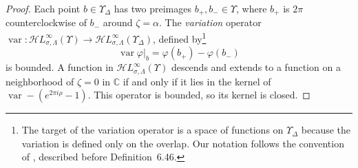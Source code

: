 \documentclass{article}
\newcommand{\singexp}[2]{\mathcal{H}L^\infty_{#1, #2}}
\newcommand{\maps}{\colon}
\newcommand{\C}{\mathbb{C}}
\DeclareMathOperator{\var}{var}
\theoremstyle{definition}
\theoremstyle{plain}
\begin{document}
\begin{proof}
Each point $b \in \Upsilon_\Delta$ has two preimages $b_+, b_- \in \Upsilon$, where $b_+$ is $2\pi$ counterclockwise of $b_-$ around $\zeta = \alpha$. The {\em variation} operator $\var \maps \singexp{\sigma}{\Lambda}(\Upsilon) \to \singexp{\sigma}{\Lambda}(\Upsilon_\Delta)$, defined by\footnote{The target of the variation operator is a space of functions on $\Upsilon_\Delta$ because the variation is defined only on the overlap. Our notation follows the convention of \cite{diverg-resurg-i}, described before Definition~6.46.}
\[ \var \varphi \big|_b = \varphi(b_+) - \varphi(b_-) \]
is bounded. A function in $\singexp{\sigma}{\Lambda}(\Upsilon)$ descends and extends to a function on a neighborhood of $\zeta = 0$ in $\C$ if and only if it lies in the kernel of $\var - (e^{2\pi i \rho} - 1)$. This operator is bounded, so its kernel is closed.
\end{proof}
\end{document}
